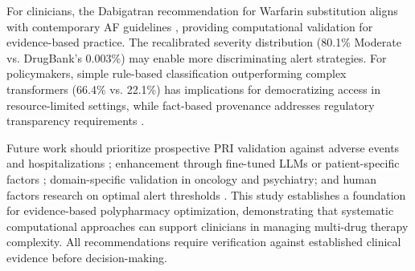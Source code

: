 \documentclass[11pt,a4paper]{article}
\begin{document}
For clinicians, the Dabigatran recommendation for Warfarin substitution aligns with contemporary AF guidelines \cite{january2019afib, joglar2023afib}, providing computational validation for evidence-based practice. The recalibrated severity distribution (80.1\% Moderate vs. DrugBank's 0.003\%) may enable more discriminating alert strategies. For policymakers, simple rule-based classification outperforming complex transformers (66.4\% vs. 22.1\%) has implications for democratizing access in resource-limited settings, while fact-based provenance addresses regulatory transparency requirements \cite{fda2021ai}.

Future work should prioritize prospective PRI validation against adverse events and hospitalizations \cite{kashyap2019clinical}; enhancement through fine-tuned LLMs or patient-specific factors \cite{singhal2023large, johnson2011clinical}; domain-specific validation in oncology and psychiatry; and human factors research on optimal alert thresholds \cite{kawamoto2005improving}. This study establishes a foundation for evidence-based polypharmacy optimization, demonstrating that systematic computational approaches can support clinicians in managing multi-drug therapy complexity. All recommendations require verification against established clinical evidence before decision-making.

\end{document}
